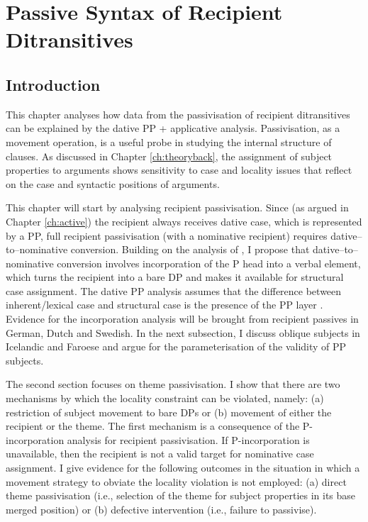 \chapter{Passive Syntax of Recipient Ditransitives}\label{ch:passive}
\section{Introduction}
This chapter analyses how data from the passivisation of recipient ditransitives can be explained by the dative PP + applicative analysis. Passivisation, as a movement operation, is a useful probe in studying the internal structure of clauses. As discussed in Chapter \ref{ch:theoryback}, the assignment of subject properties to arguments shows sensitivity to case and locality issues that reflect on the case and syntactic positions of arguments.

This chapter will start by analysing recipient passivisation. Since (as argued in Chapter \ref{ch:active}) the recipient always receives dative case, which is represented by a PP, full recipient passivisation (with a nominative recipient) requires dative--to--nominative conversion. Building on the analysis of \cite{Alexiadou.2014}, I propose that dative--to--nominative conversion involves incorporation of the P head into a verbal element, which turns the recipient into a bare DP and makes it available for structural case assignment. The dative PP analysis assumes that the difference between inherent/lexical case and structural case is the presence of the PP layer \citep{Bayer.2001}. Evidence for the incorporation analysis will be brought from recipient passives in German, Dutch and Swedish. In the next subsection, I discuss oblique subjects in Icelandic and Faroese and argue for the parameterisation of the validity of PP subjects.

The second section focuses on theme passivisation. I show that there are two mechanisms by which the locality constraint can be violated, namely: (a) restriction of subject movement to bare DPs or (b) movement of either the recipient or the theme. The first mechanism is a consequence of the P-incorporation analysis for recipient passivisation. If P-incorporation is unavailable, then the recipient is not a valid target for nominative case assignment. I give evidence for the following outcomes in the situation in which a movement strategy to obviate the locality violation is not employed: (a) direct theme passivisation (i.e., selection of the theme for subject properties in its base merged position) or (b) defective intervention (i.e., failure to passivise).

